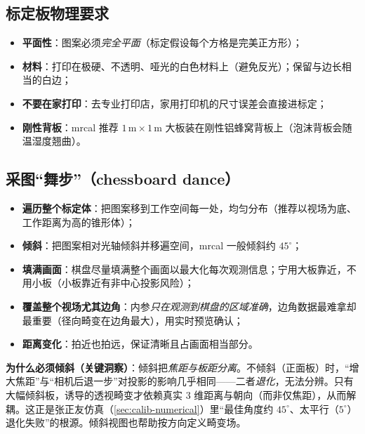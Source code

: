 \subsection{标定板物理要求}
\begin{itemize}
  \item \textbf{平面性}：图案必须\emph{完全平面}（标定假设每个方格是完美正方形）\cite{galeone2018guidelines}；
  \item \textbf{材料}：打印在极硬、不透明、哑光的白色材料上（避免反光）；保留与边长相当的白边；
  \item \textbf{不要在家打印}：去专业打印店，家用打印机的尺寸误差会直接进标定\cite{galeone2018guidelines}；
  \item \textbf{刚性背板}：mrcal\cite{kogan2024mrcal} 推荐 $1\,\mathrm{m}\times1\,\mathrm{m}$ 大板装在刚性铝蜂窝背板上（泡沫背板会随温湿度翘曲）。
\end{itemize}

\subsection{采图“舞步”（chessboard dance）}
\begin{itemize}
  \item \textbf{遍历整个标定体}：把图案移到工作空间每一处，均匀分布\cite{galeone2018guidelines}（推荐以视场为底、工作距离为高的锥形体）；
  \item \textbf{倾斜}：把图案相对光轴倾斜并移遍空间，mrcal 一般倾斜约 $45^\circ$\cite{kogan2024mrcal}；
  \item \textbf{填满画面}：棋盘尽量填满整个画面以最大化每次观测信息；宁用大板靠近，不用小板（小板靠近有非中心投影风险）\cite{kogan2024mrcal}；
  \item \textbf{覆盖整个视场尤其边角}：内参\emph{只在观测到棋盘的区域准确}，边角数据最难拿却最重要（径向畸变在边角最大），用实时预览确认\cite{kogan2024mrcal}；
  \item \textbf{距离变化}：拍近也拍远，保证清晰且占画面相当部分。
\end{itemize}

\begin{insight}
\textbf{为什么必须倾斜（关键洞察）}\cite{kogan2024mrcal}：倾斜把\emph{焦距与板距分离}。不倾斜（正面板）时，“增大焦距”与“相机后退一步”对投影的影响几乎相同——二者\emph{退化}，无法分辨。只有大幅倾斜板，诱导的透视畸变才依赖真实 $3$ 维距离与朝向（而非仅焦距），从而解耦。这正是张正友仿真（\cref{sec:calib-numerical}）里“最佳角度约 $45^\circ$、太平行（$5^\circ$）退化失败”的根源。倾斜视图也帮助按方向定义畸变场。
\end{insight}

